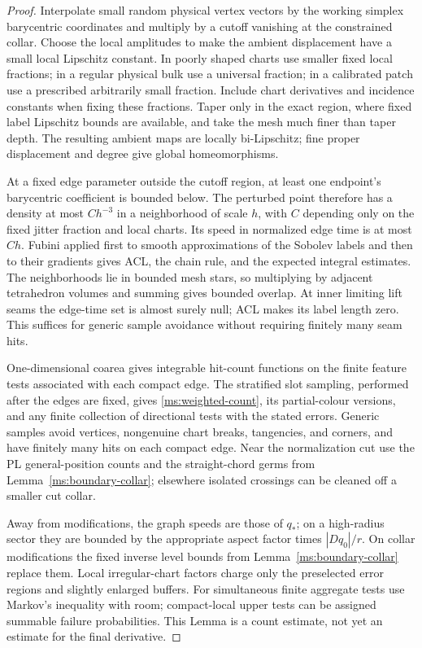 \documentclass[11pt]{article}
\numberwithin{equation}{section}
\theoremstyle{definition}
\theoremstyle{remark}
\begin{document}
\begin{proof}
Interpolate small random physical vertex vectors by the working
simplex barycentric coordinates and multiply by a cutoff vanishing
at the constrained collar.  Choose the local amplitudes to make the
ambient displacement have a small local Lipschitz constant.  In
poorly shaped charts use smaller fixed local fractions; in a regular
physical bulk use a universal fraction; in a calibrated patch use a
prescribed arbitrarily small fraction.  Include chart derivatives
and incidence constants when fixing these fractions.  Taper only in
the exact region, where fixed label Lipschitz bounds are available,
and take the mesh much finer than taper depth.  The resulting
ambient maps are locally bi-Lipschitz; fine proper displacement and
degree give global homeomorphisms.

At a fixed edge parameter outside the cutoff region, at least one
endpoint's barycentric coefficient is bounded below.  The perturbed
point therefore has a density at most $C h^{-3}$ in a neighborhood
of scale $h$, with $C$ depending only on the fixed jitter fraction
and local charts.  Its speed in normalized edge time is at most
$C h$.  Fubini applied first to smooth approximations of the
Sobolev labels and then to their gradients gives ACL, the chain
rule, and the expected integral estimates.  The neighborhoods lie
in bounded mesh stars, so multiplying by adjacent tetrahedron
volumes and summing gives bounded overlap.  At inner limiting lift
seams the edge-time set is almost surely null; ACL makes its label
length zero.  This suffices for generic sample avoidance without
requiring finitely many seam hits.

One-dimensional coarea gives integrable hit-count functions on the
finite feature tests associated with each compact edge.  The
stratified slot sampling, performed after the edges are fixed,
gives \eqref{ms:weighted-count}, its partial-colour versions, and any
finite collection of directional tests with the stated errors.
Generic samples avoid vertices, nongenuine chart breaks, tangencies,
and corners, and have finitely many hits on each compact edge.
Near the normalization cut use the PL general-position counts and
the straight-chord germs from Lemma~\ref{ms:boundary-collar}; elsewhere
isolated crossings can be cleaned off a smaller cut collar.

Away from modifications, the graph speeds are those of $q_*$; on a
high-radius sector they are bounded by the appropriate aspect
factor times $|Dq_0|/r$.  On collar modifications the fixed inverse
level bounds from Lemma~\ref{ms:boundary-collar} replace them.  Local
irregular-chart factors charge only the preselected error regions
and slightly enlarged buffers.  For simultaneous finite aggregate
tests use Markov's inequality with room; compact-local upper tests
can be assigned summable failure probabilities.  This Lemma is a
count estimate, not yet an estimate for the final derivative.
\end{proof}
\end{document}
